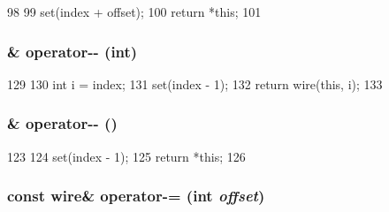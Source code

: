 \begin{DoxyCode}
98         {
99             set(index + offset);
100             return *this;
101         }
\end{DoxyCode}
\hypertarget{classTimeBuffer_1_1wire_ad635ac4e1df2d6e7880602b4804c03a5}{
\subsubsection[{operator-\/-\/}]{\& operator-\/-\/ (int)}}
\label{classTimeBuffer_1_1wire_ad635ac4e1df2d6e7880602b4804c03a5}



\begin{DoxyCode}
129         {
130             int i = index;
131             set(index - 1);
132             return wire(this, i);
133         }
\end{DoxyCode}
\hypertarget{classTimeBuffer_1_1wire_a86cbe68de5240a72f6c4dbe99414e6ff}{
\subsubsection[{operator-\/-\/}]{\& operator-\/-\/ ()}}
\label{classTimeBuffer_1_1wire_a86cbe68de5240a72f6c4dbe99414e6ff}



\begin{DoxyCode}
123         {
124             set(index - 1);
125             return *this;
126         }
\end{DoxyCode}
\hypertarget{classTimeBuffer_1_1wire_a0bab44a2a3adf81ee12237b4070fecc8}{
\subsubsection[{operator-\/=}]{\setlength{\rightskip}{0pt plus 5cm}const {\bf wire}\& operator-\/= (int {\em offset})}}
\label{classTimeBuffer_1_1wire_a0bab44a2a3adf81ee12237b4070fecc8}



